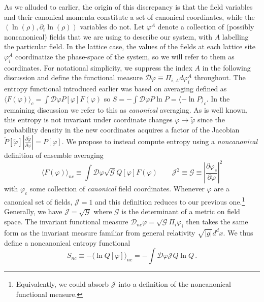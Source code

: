 \documentclass[11pt,a4paper]{article}
\begin{document}
As we alluded to earlier, the origin of this discrepancy is that the field variables and their canonical momenta constitute a set of canonical coordinates, while the $(\ln(\rho),\partial_t\ln(\rho))$ variables do not.
Let $\varphi^A$ denote a collection of (possibly noncanonical) fields that we are using to describe our system, with $A$ labelling the particular field.
In the lattice case, the values of the fields at each lattice site $\varphi_i^A$ coordinatize the phase-space of the system, so we will refer to them as coordinates.
For notational simplicity, we suppress the index $A$ in the following discussion and define the functional measure $\mathcal{D}\varphi \equiv \Pi_{i,A} d\varphi_i^A$ throughout.
The entropy functional introduced earlier was based on averaging defined as $\langle F(\varphi)\rangle_c = \int\mathcal{D}\varphi P[\varphi]F(\varphi)$ so 
$S=-\int\mathcal{D}\varphi P\ln P = \langle -\ln P \rangle_c$.
In the remaining discussion we refer to this as \emph{canonical} averaging.
As is well known, this entropy is not invariant under coordinate changes $\varphi \to \tilde{\varphi}$ since the probability density in the new coordinates acquires a factor of the Jacobian $\tilde{P}[\tilde{\varphi}]\left|\frac{\partial\tilde{\varphi}}{\partial\varphi}\right| = P[\varphi]$.
We propose to instead compute entropy using a \emph{noncanonical} definition of ensemble averaging 
\begin{equation}
  \langle F(\varphi)\rangle_{nc} \equiv \int\mathcal{D}\varphi \sqrt{\mathcal{G}} Q[\varphi] F(\varphi) \qquad \mathcal{J}^2  \equiv \mathcal{G} \equiv \left|\frac{\partial\varphi_c}{\partial\varphi} \right|^2
  \label{eqn:noncanonical_average}
\end{equation}
with $\varphi_{c}$ some collection of \emph{canonical} field coordinates.
Whenever $\varphi$ are a canonical set of fields, $\mathcal{J}=1$ and this definition reduces to our previous one.\footnote{Equivalently, we could absorb $\mathcal{J}$ into a definition of the noncanonical functional measure.}
Generally, we have $\mathcal{J} = \sqrt{\mathcal{G}}$ where $\mathcal{G}$ is the determinant of a metric on field space.
The invariant functional measure $\mathcal{D}_{nc}\varphi = \sqrt{\mathcal{G}}\Pi_i\varphi_i$ then takes the same form as the invariant measure familiar from general relativity $\sqrt{|g|}d^dx$.
We thus define a noncanonical entropy functional
\begin{equation}
  S_{nc} \equiv -\langle \ln Q[\varphi]\rangle_{nc} = -\int\mathcal{D}\varphi\mathcal{J}Q\ln Q \, .
  \label{eqn:entropy_noncanonical}
\end{equation}
\end{document}
